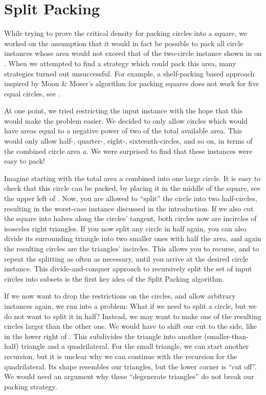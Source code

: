 \documentclass[a4paper,style=print,bibliography=totoc,nexus,lnum,extramargin]{tubsbook}
\begin{document}
\chapter{Split Packing}\label{ch:split-packing}

While trying to prove the critical density for packing circles into a square, we worked on the assumption that it would in fact be possible to pack all circle instances whose area would not exceed that of the two-circle instance shown in  on .
When we attempted to find a strategy which could pack this area, many strategies turned out unsuccessful. For example, a shelf-packing based approach inspired by Moon \& Moser's algorithm for packing squares does not work for five equal circles, see .


At one point, we tried restricting the input instance with the hope that this would make the problem easier. We decided to only allow circles which would have areas equal to a negative power of two of the total available area. This would only allow \mbox{half-,} \mbox{quarter-,} \mbox{eight-,} sixteenth-circles, and so on, in terms of the combined circle area $a$. We were surprised to find that these instances were easy to pack!

Imagine starting with the total area $a$ combined into one large circle. It is easy to check that this circle can be packed, by placing it in the middle of the square, see the upper left of . Now, you are allowed to “split” the circle into two half-circles, resulting in the worst-case instance discussed in the introduction. If we also cut the square into halves along the circles' tangent, both circles now are incircles of isosceles right triangles.
If you now split any circle in half again, you can also divide its surrounding triangle into two smaller ones with half the area, and again the resulting circles are the triangles' incircles.
This allows you to recurse, and to repeat the splitting as often as necessary, until you arrive at the desired circle instance. This divide-and-conquer approach to recursively split the set of input circles into subsets is the first key idea of the Split Packing algorithm.


If we now want to drop the restrictions on the circles, and allow arbitrary instances again, we run into a problem: What if we need to split a circle, but we do not want to split it in half? Instead, we may want to make one of the resulting circles larger than the other one. We would have to shift our cut to the side, like in the lower right of . This subdivides the triangle into another (smaller-than-half) triangle and a quadrilateral. For the small triangle, we can start another recursion, but it is unclear why we can continue with the recursion for the quadrilateral. Its shape resembles our triangles, but the lower corner is “cut off”. We would need an argument why these “degenerate triangles” do not break our packing strategy.
\end{document}
